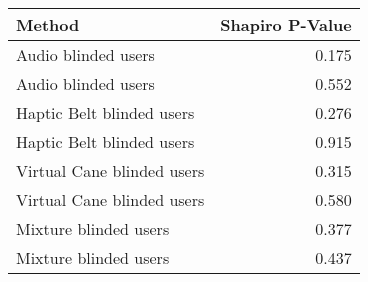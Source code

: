 
\centering
\begin{tabular}{lr}
\toprule
                    Method &  Shapiro P-Value \\
\midrule
       Audio blinded users &            0.175 \\
       Audio blinded users &            0.552 \\
 Haptic Belt blinded users &            0.276 \\
 Haptic Belt blinded users &            0.915 \\
Virtual Cane blinded users &            0.315 \\
Virtual Cane blinded users &            0.580 \\
     Mixture blinded users &            0.377 \\
     Mixture blinded users &            0.437 \\
\bottomrule
\end{tabular}
